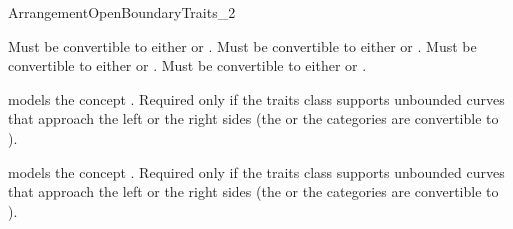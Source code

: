 \begin{ccRefConcept}{ArrangementOpenBoundaryTraits_2}

\ccRefines
{}


  {Must be convertible to either  or
        .}
  {Must be convertible to either  or
        .}
  {Must be convertible to either  or
        .}
  {Must be convertible to either  or
        .}

\ccThreeToTwo
{}%
  {models the concept .
  Required only if the traits class supports unbounded curves that
  approach the left or the right sides (the 
  or the  categories are convertible to
  ).}

\ccThreeToTwo
{}%
  {models the concept .
  Required only if the traits class supports unbounded curves that
  approach the left or the right sides (the 
  or the  categories are convertible to
  ).}


\end{ccRefConcept}
